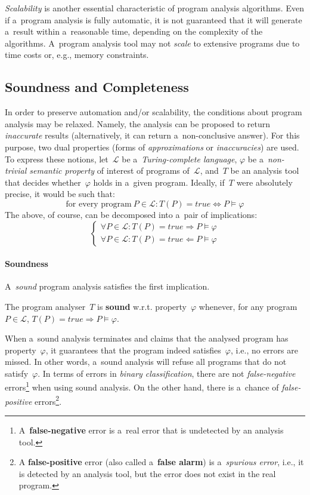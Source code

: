 \emph{Scalability} is another essential characteristic of program analysis algorithms. Even if a~program analysis is fully automatic, it is not guaranteed that it will generate a~result within a~reasonable time, depending on the complexity of the algorithms. A~program analysis tool may not \emph{scale} to extensive programs due to time costs or, e.g., memory constraints.

\subsection{Soundness and Completeness}

In order to preserve automation and/or scalability, the conditions about program analysis may be relaxed. Namely, the analysis can be proposed to return \emph{inaccurate} results (alternatively, it can return a~non-conclusive  answer). For this purpose, two dual properties (forms of \emph{approximations} or \emph{inaccuracies}) are used. To express these notions, let~$ \mathcal{L} $ be a~\emph{Turing-complete language}, $ \varphi $ be a~\emph{non-trivial semantic property} of interest of programs of~$ \mathcal{L} $, and~$ T $ be an analysis tool that decides whether~$ \varphi $ holds in a~given program. Ideally, if~$ T $ were absolutely precise, it would be such that:
$$
    \text{for every program}\ P \in \mathcal{L}: T(P) = true \Longleftrightarrow P \models \varphi
$$
The above, of course, can be decomposed into a~pair of implications:
$$
\begin{cases}
    \forall P \in \mathcal{L}: T(P) = true \Longrightarrow P \models \varphi \\
    \forall P \in \mathcal{L}: T(P) = true \Longleftarrow P \models \varphi
\end{cases}
$$

\paragraph{Soundness}
A~\emph{sound} program analysis satisfies the first implication.
\begin{definition}
    The program analyser~$ T $ is \textbf{sound} w.r.t. property~$ \varphi $ whenever, for any program $ P \in \mathcal{L} $, $ T(P) = true \Longrightarrow P \models \varphi $.
\end{definition}
When a~sound analysis terminates and claims that the analysed program has property~$ \varphi $, it guarantees that the program indeed satisfies~$ \varphi $, i.e., no errors are missed. In other words, a~sound analysis will refuse all programs that do not satisfy~$ \varphi $. In terms of errors in \emph{binary classification}, there are not \emph{false-negative} errors\footnote{A~\textbf{false-negative} error is a~real error that is undetected by an analysis tool.} when using sound analysis. On the other hand, there is a~chance of \emph{false-positive} errors\footnote{A \textbf{false-positive} error (also called a~\textbf{false alarm}) is a~\emph{spurious error}, i.e., it is detected by an analysis tool, but the error does not exist in the real program.}.

